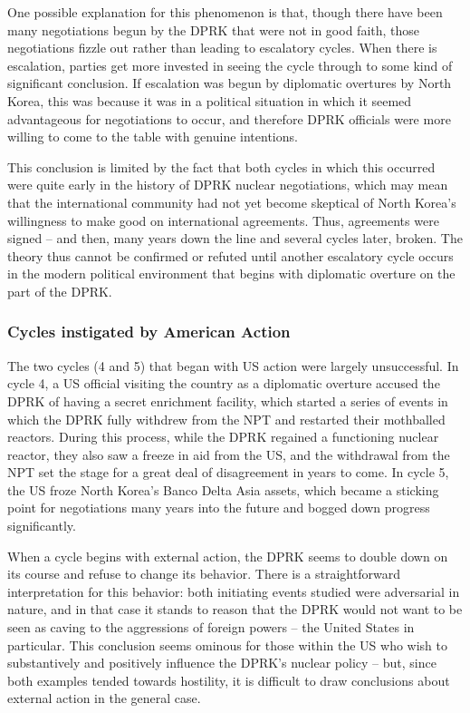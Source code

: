 \documentclass{article}
\begin{document}
One possible explanation for this phenomenon is that, though there have been many negotiations begun by the DPRK that were not in good faith, those negotiations fizzle out rather than leading to escalatory cycles. When there is escalation, parties get more invested in seeing the cycle through to some kind of significant conclusion. If escalation was begun by diplomatic overtures by North Korea, this was because it was in a political situation in which it seemed advantageous for negotiations to occur, and therefore DPRK officials were more willing to come to the table with genuine intentions.

This conclusion is limited by the fact that both cycles in which this occurred were quite early in the history of DPRK nuclear negotiations, which may mean that the international community had not yet become skeptical of North Korea’s willingness to make good on international agreements. Thus, agreements were signed – and then, many years down the line and several cycles later, broken. The theory thus cannot be confirmed or refuted until another escalatory cycle occurs in the modern political environment that begins with diplomatic overture on the part of the DPRK.

\subsubsection{Cycles instigated by American Action}
The two cycles (4 and 5) that began with US action were largely unsuccessful. In cycle 4, a US official visiting the country as a diplomatic overture accused the DPRK of having a secret enrichment facility, which started a series of events in which the DPRK fully withdrew from the NPT and restarted their mothballed reactors. During this process, while the DPRK regained a functioning nuclear reactor, they also saw a freeze in aid from the US, and the withdrawal from the NPT set the stage for a great deal of disagreement in years to come. In cycle 5, the US froze North Korea’s Banco Delta Asia assets, which became a sticking point for negotiations many years into the future and bogged down progress significantly.

When a cycle begins with external action, the DPRK seems to double down on its course and refuse to change its behavior. There is a straightforward interpretation for this behavior: both initiating events studied were adversarial in nature, and in that case it stands to reason that the DPRK would not want to be seen as caving to the aggressions of foreign powers – the United States in particular. This conclusion seems ominous for those within the US who wish to substantively and positively influence the DPRK’s nuclear policy – but, since both examples tended towards hostility, it is difficult to draw conclusions about external action in the general case.
\end{document}
